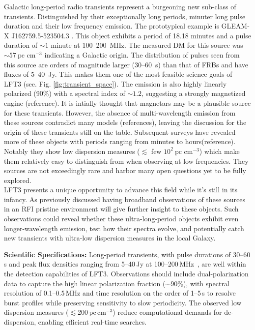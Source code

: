 Galactic long-period radio transients represent a burgeoning new sub-class of transients. Distinguished by their exceptionally long periods, minuter long pulse duration and their low frequency emission. The prototypical example is GLEAM-X J162759.5-523504.3 \citep{hurley_walker_radio_2022}. This object exhibits a period of 18.18 minutes and a pulse duration of $\sim 1$ minute at 100--200~MHz. The measured DM for this source was $\sim57~\text{pc cm}^{-3}$ indicating a Galactic origin. The distribution of pulses seen from this source are orders of magnitude larger (30--60~s) than that of FRBs and have fluxes of 5--40~Jy. This makes them one of the most feasible science goals of LFT3 (see. Fig. \ref{fig:transient_space}). The emission is also highly linearly polarized (90\%) with a spectral index of $\sim 1.2$, suggesting a strongly magnetized engine (reference). It is intially thought that magnetars may be a plausible source for these transients. However, the absence of multi-wavelength emission from these sources contradict many models (references), leaving the discussion for the origin of these transients still on the table. Subsequent surveys have revealed more of these objects with periods ranging from minutes to hours(reference). Notably they show low dispersion measures ($\lesssim$ few $10^2~\text{pc cm}^{-3}$) which make them relatively easy to distinguish from when observing at low frequencies. They sources are not exceedingly rare and harbor many open questions yet to be fully explored. \\ 
LFT3 presents a unique opportunity to advance this field while it's still in its infancy. As previously discussed having broadband observations of these sources in an RFI pristine environment will give further insight to these objects. Such observations could reveal whether these ultra-long-period objects exhibit even longer-wavelength emission, test how their spectra evolve, and potentially catch new transients with ultra-low dispersion measures in the local Galaxy.

\textbf{Scientific Specifications:} Long-period transients, with pulse durations of 30--60\,s and peak flux densities ranging from 5--40\,Jy at 100--200\,MHz~\citep{hurley_walker_radio_2022}, are well within the detection capabilities of LFT3. Observations should include dual-polarization data to capture the high linear polarization fraction ($\sim$90\%), with spectral resolution of 0.1--0.5\,MHz and time resolution on the order of 1--5\,s to resolve burst profiles while preserving sensitivity to slow periodicity. The observed low dispersion measures ($\lesssim$200\,pc\,cm$^{-3}$) reduce computational demands for de-dispersion, enabling efficient real-time searches. 

